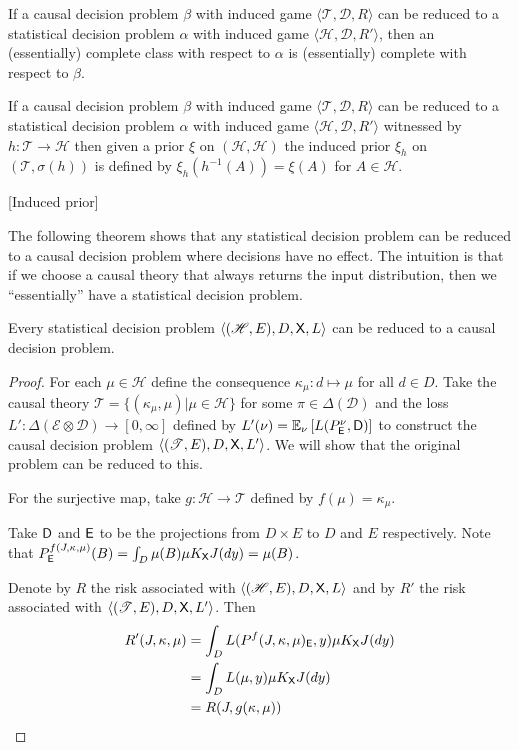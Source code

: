 \begin{corollary}
If a causal decision problem $\beta$ with induced game $\langle \mathscr{T},\mathscr{D}, R\rangle$ can be reduced to a statistical decision problem $\alpha$ with induced game $\langle \mathscr{H},\mathscr{D},R' \rangle$, then an (essentially) complete class with respect to $\alpha$ is (essentially) complete with respect to $\beta$.
\end{corollary}

\begin{definition}
If a causal decision problem $\beta$ with induced game $\langle \mathscr{T},\mathscr{D}, R\rangle$ can be reduced to a statistical decision problem $\alpha$ with induced game $\langle \mathscr{H},\mathscr{D},R' \rangle$ witnessed by $h:\mathscr{T}\to\mathscr{H}$ then given a prior $\xi$ on $(\mathscr{H},\mathcal{H})$ the induced prior $\xi_h$ on $(\mathscr{T},\sigma(h))$ is defined by $\xi_h(h^{-1}(A)) = \xi(A)$ for $A\in \mathcal{H}$.
\end{definition}[Induced prior]


The following theorem shows that any statistical decision problem can be reduced to a causal decision problem where decisions have no effect. The intuition is that if we choose a causal theory that always returns the input distribution, then we ``essentially'' have a statistical decision problem.

\begin{theorem}
Every statistical decision problem $\langle (\mathscr{H},E),D,\mathsf{X},L\rangle$ can be reduced to a causal decision problem.
\end{theorem}
\begin{proof}
For each $\mu\in \mathscr{H}$ define the consequence $\kappa_\mu:d\mapsto \mu$ for all $d\in D$. Take the causal theory $\mathscr{T}=\{(\kappa_\mu,\mu)|\mu\in \mathscr{H}\}$ for some $\pi\in \Delta(\mathcal{D})$ and the loss $L':\Delta(\mathcal{E}\otimes\mathcal{D})\to[0,\infty]$ defined by $L'(\nu) = \mathbb{E}_\nu \left[L(P^\nu_{\mathsf{E}},\mathsf{D})\right]$ to construct the causal decision problem $\langle (\mathscr{T},E),D,\mathsf{X},L'\rangle$. We will show that the original problem can be reduced to this.

For the surjective map, take $g:\mathscr{H}\to \mathscr{T}$ defined by $f(\mu)=\kappa_\mu$.

Take $\mathsf{D}$ and $\mathsf{E}$ to be the projections from $D\times E$ to $D$ and $E$ respectively. Note that $P^{f(J,\kappa,\mu)}_{\mathsf{E}}(B) = \int_D \mu(B) \mu K_{\mathsf{X}} J(dy) = \mu(B)$.

Denote by $R$ the risk associated with $\langle (\mathscr{H},E),D,\mathsf{X},L\rangle$ and by $R'$ the risk associated with $\langle (\mathscr{T},E),D,\mathsf{X},L'\rangle$. Then
\begin{align}
    R'(J,\kappa,\mu) &= \int_D L(P^f(J,\kappa,\mu)_{\mathsf{E}}, y) \mu K_{\mathsf{X}} J(dy)\\
                   &= \int_D L(\mu,y) \mu K_{\mathsf{X}} J(dy)\\
                   &=R(J,g(\kappa,\mu))
\end{align}
\end{proof}

